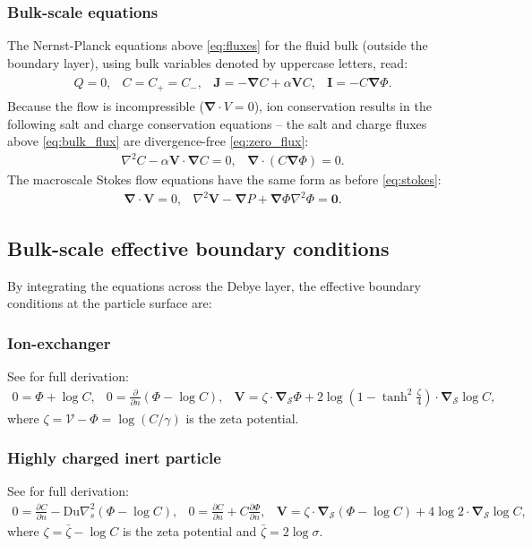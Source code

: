 \documentclass[10pt]{ijnam}
\newcommand{\deriv}[2]{\frac{\partial #1}{\partial #2}}
\newcommand{\pars}[1]{\left(#1\right)}
\newcommand\Laplacian{\nabla^2}
\newcommand\bnabla{\boldsymbol{\nabla}}
\newcommand\bV{\boldsymbol{V}}
\newcommand\bI{\boldsymbol{I}}
\newcommand\bJ{\boldsymbol{J}}
\newcommand\bzero{\boldsymbol{0}}
\newcommand\cV{\mathscr{V}}
\begin{document}
\subsubsection  {Bulk-scale equations}
The Nernst-Planck equations above \eqref{eq:fluxes} for the fluid bulk (outside
the boundary layer), using bulk variables denoted by uppercase letters, read:
\begin{eqnarray} \begin{array}{cccc} \label{eq:bulk_flux}
  Q = 0, &
  C = C_+ = C_-, &
\bJ = -\bnabla C + \alpha \bV C, &
\bI = -C \bnabla \varPhi.
\end{array}\end{eqnarray}
Because the flow is incompressible ($\bnabla \cdot V = 0$), 
ion conservation results in the following 
salt and charge conservation equations -- the salt and charge fluxes above 
\eqref{eq:bulk_flux} are divergence-free
\eqref{eq:zero_flux}:
\begin{eqnarray} 
\label{eq:salt_charge}
\Laplacian C - \alpha \bV \cdot \bnabla C = 0, &
\bnabla \cdot \pars{ C \bnabla \varPhi } = 0.
\end{eqnarray}
The macroscale Stokes flow equations have the same form as before \eqref{eq:stokes}:
\begin{eqnarray} 
\bnabla \cdot \bV = 0, &   
\Laplacian \bV - \bnabla P + \bnabla \varPhi \Laplacian \varPhi = \bzero.
\end{eqnarray}

\subsection{Bulk-scale effective boundary conditions}
By integrating the equations across the Debye layer,
the effective boundary conditions at the particle surface are:
\subsubsection{Ion-exchanger} See \cite{yariv2010migration} for full derivation:
\begin{eqnarray} \label{eq:ionex_bnd}
0 = \varPhi + \log C, &
0 = \deriv{}{n} \pars{\varPhi - \log C}, &
\bV = 
\zeta \cdot \bnabla_\mathcal{S} \varPhi 
+ 2\log\pars{1-\tanh^2\frac{\zeta}{4}} \cdot \bnabla_\mathcal{S} \log C,
\end{eqnarray}
where $\zeta = \cV - \varPhi = \log (C / \gamma)$ 
is the zeta potential.

\subsubsection{Highly charged inert particle}
See \cite{schnitzer2012surface} for full derivation:
\begin{eqnarray} \label{eq:ephor_bnd}
0 = {\deriv{C}{n} - \text{Du} \nabla^2_s \pars{\varPhi - \log C}}, & 
0 = {\deriv{C}{n} + C \deriv{\varPhi}{n}}, &
\bV = \zeta \cdot \bnabla_\mathcal{S} \pars{\varPhi - \log C} +
4 \log 2 \cdot \bnabla_\mathcal{S} \log C,
\end{eqnarray}
where $\zeta = \bar{\zeta} - \log C$ 
is the zeta potential and $\bar{\zeta} = 2 \log \sigma$.
\end{document}
